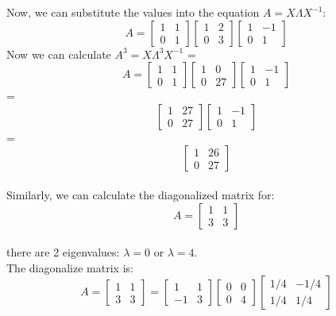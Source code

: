 \documentclass{article}
\begin{document}
Now, we can substitute the values into the equation \( A = X \Lambda X^{-1} \):
\[
A = \begin{bmatrix}
    1 & 1 \\
    0 & 1
\end{bmatrix}
\begin{bmatrix}
    1 & 2 \\
    0 & 3
\end{bmatrix}
\begin{bmatrix}
    1 & -1 \\
    0 & 1
\end{bmatrix}
\]
Now we can calculate \(A^3 = X \Lambda^3 X^{-1} \) = 
\[
A = \begin{bmatrix}
    1 & 1 \\
    0 & 1
\end{bmatrix}
\begin{bmatrix}
    1 & 0 \\
    0 & 27
\end{bmatrix}
\begin{bmatrix}
    1 & -1 \\
    0 & 1
\end{bmatrix}
\]
= \[ \begin{bmatrix}
    1 & 27 \\
    0 & 27
\end{bmatrix}
\begin{bmatrix}
    1 & -1 \\
    0 & 1
\end{bmatrix}
\]
= \[\begin{bmatrix}
    1 & 26 \\
    0 & 27
\end{bmatrix} \]
\\ Similarly, we can calculate the diagonalized matrix for: 
\[
A = 
\begin{bmatrix}
    1 & 1 \\
    3 & 3
\end{bmatrix}
\]
\\ there are 2 eigenvalues: $\lambda = 0$ or $\lambda = 4$.    
\\ The diagonalize matrix is:
\[
A = 
\begin{bmatrix}
    1 & 1 \\
    3 & 3
\end{bmatrix}
= \begin{bmatrix}
    1 & 1 \\
    -1 & 3
\end{bmatrix}
\begin{bmatrix}
    0 & 0 \\
    0 & 4
\end{bmatrix}
\begin{bmatrix}
    1/4 & -1/4 \\
    1/4 & 1/4
\end{bmatrix}
\]
\end{document}
